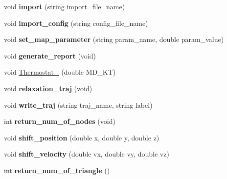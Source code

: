 \begin{DoxyCompactItemize}
\item 
void {\bfseries import} (string import\+\_\+file\+\_\+name)\hypertarget{classMembrane_aeb1fc7d31b55a36f50ec2e08da6868de}{}\label{classMembrane_aeb1fc7d31b55a36f50ec2e08da6868de}

\item 
void {\bfseries import\+\_\+config} (string config\+\_\+file\+\_\+name)\hypertarget{classMembrane_af7a605e77cda2b76181e4e5cc1062212}{}\label{classMembrane_af7a605e77cda2b76181e4e5cc1062212}

\item 
void {\bfseries set\+\_\+map\+\_\+parameter} (string param\+\_\+name, double param\+\_\+value)\hypertarget{classMembrane_af9277adfc93a1eab3444b43d3ecfeeeb}{}\label{classMembrane_af9277adfc93a1eab3444b43d3ecfeeeb}

\item 
void {\bfseries generate\+\_\+report} (void)\hypertarget{classMembrane_a36462fa0881cf8ee5a0c7268ae4fdd30}{}\label{classMembrane_a36462fa0881cf8ee5a0c7268ae4fdd30}

\item 
void \hyperlink{classMembrane_acd87b1b9cf2c6c91a887749528c9f556}{Thermostat\+\_} (double M\+D\+\_\+\+KT)
\item 
void {\bfseries relaxation\+\_\+traj} (void)\hypertarget{classMembrane_aa4286fd20ae452585ec5d19c67268eed}{}\label{classMembrane_aa4286fd20ae452585ec5d19c67268eed}

\item 
void {\bfseries write\+\_\+traj} (string traj\+\_\+name, string label)\hypertarget{classMembrane_af874e67698eab4a453afaf7e19285bfe}{}\label{classMembrane_af874e67698eab4a453afaf7e19285bfe}

\item 
int {\bfseries return\+\_\+num\+\_\+of\+\_\+nodes} (void)\hypertarget{classMembrane_ab2ddc39626226efe51bc7e00d651571c}{}\label{classMembrane_ab2ddc39626226efe51bc7e00d651571c}

\item 
void {\bfseries shift\+\_\+position} (double x, double y, double z)\hypertarget{classMembrane_aae01bd33119728d0b268081bee3815e7}{}\label{classMembrane_aae01bd33119728d0b268081bee3815e7}

\item 
void {\bfseries shift\+\_\+velocity} (double vx, double vy, double vz)\hypertarget{classMembrane_a2fb1efa5e780590d62530cc31c8e6b07}{}\label{classMembrane_a2fb1efa5e780590d62530cc31c8e6b07}

\item 
int {\bfseries return\+\_\+num\+\_\+of\+\_\+triangle} ()\hypertarget{classMembrane_ac3ff3f3a5177589537f5bc6cbd05c27d}{}\label{classMembrane_ac3ff3f3a5177589537f5bc6cbd05c27d}


\end{DoxyCompactItemize}
